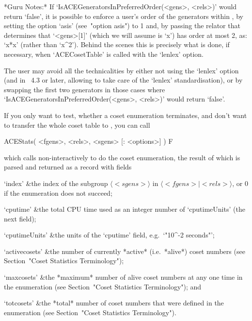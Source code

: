 *Guru Notes:*
If  `IsACEGeneratorsInPreferredOrder(<gens>,  <rels>)'  would   return
`false', it is possible to enforce a user's order  of  the  generators
within {\ACE}, by setting the option `asis' (see~"option asis")  to  1
and, by passing the relator that determines that `<gens>[1]' (which we
will assume is `x') has order  at  most  2,  as:  `x*x'  (rather  than
`x^2').  Behind  the  scenes  this  is  precisely  what  is  done,  if
necessary, when `ACECosetTable' is called with the `lenlex' option.

The user may avoid all the technicalities  by  either  not  using  the
`lenlex' option (and in {\GAP}~4.3 or later, allowing {\GAP}  to  take
care of the `lenlex' standardisation), or by swapping  the  first  two
generators          in           those           cases           where
`IsACEGeneratorsInPreferredOrder(<gens>,   <rels>)'    would    return
`false'.


If you only want to  test, whether a coset enumeration terminates, and
don't want to  transfer the whole coset table  to {\GAP}, you can call

\>ACEStats( <fgens>, <rels>, <sgens> [: <options>] ) F

which calls {\ACE} non-interactively to do the coset enumeration,  the
result of which is parsed and returned as a {\GAP} record with fields

\beginitems

\quad`index' &the index of the subgroup $\langle <sgens>  \rangle$  in
$\langle <fgens> \mid <rels> \rangle$, or $0$ if the enumeration  does
not succeed;

\quad`cputime' &the total CPU  time  used  as  an  integer  number  of
`cputimeUnits' (the next field);

\quad`cputimeUnits' &the units of the  `cputime'  field,  e.g.~`"10^-2
seconds"';

\quad`activecosets' &the number of currently  *active*  (i.e.~*alive*)
coset numbers (see Section~"Coset Statistics Terminology");

\quad`maxcosets' &the *maximum* number of alive coset numbers  at  any
one  time  in   the   enumeration   (see   Section~"Coset   Statistics
Terminology"); and

\quad`totcosets' &the  *total*  number  of  coset  numbers  that  were
defined   in   the   enumeration   (see   Section~"Coset    Statistics
Terminology").

